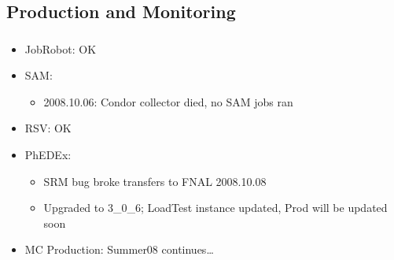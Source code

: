 \documentclass{beamer}
\begin{document}
\subsection{Production and Monitoring}
\begin{frame}
\frametitle{}
\begin{itemize}
     \item JobRobot: OK
     \item SAM:
     \begin{itemize}
         \item 2008.10.06: Condor collector died, no SAM jobs ran
     \end{itemize}
     \item RSV: OK
     \item PhEDEx:
     \begin{itemize}
        \item SRM bug broke transfers to FNAL 2008.10.08
        \item Upgraded to 3\_0\_6; LoadTest instance updated, Prod will be updated soon
     \end{itemize}
     \item MC Production: Summer08 continues\ldots{}
\end{itemize}
\end{frame}
\end{document}
